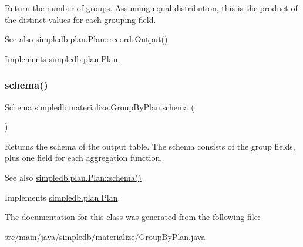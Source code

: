 Return the number of groups. Assuming equal distribution, this is the product of the distinct values for each grouping field. \begin{DoxySeeAlso}{See also}
\hyperlink{interfacesimpledb_1_1plan_1_1Plan_a187e06657d356c80a7f743d7ff8fd257}{simpledb.\+plan.\+Plan\+::records\+Output()} 
\end{DoxySeeAlso}


Implements \hyperlink{interfacesimpledb_1_1plan_1_1Plan_a187e06657d356c80a7f743d7ff8fd257}{simpledb.\+plan.\+Plan}.

\mbox{\label{classsimpledb_1_1materialize_1_1GroupByPlan_a2060788080c03855f35d72a1742e6ec6}} 
\subsubsection{\texorpdfstring{schema()}{schema()}}
{\footnotesize\ttfamily \hyperlink{classsimpledb_1_1record_1_1Schema}{Schema} simpledb.\+materialize.\+Group\+By\+Plan.\+schema (\begin{DoxyParamCaption}{ }\end{DoxyParamCaption})\hspace{0.3cm}{\ttfamily [inline]}}

Returns the schema of the output table. The schema consists of the group fields, plus one field for each aggregation function. \begin{DoxySeeAlso}{See also}
\hyperlink{interfacesimpledb_1_1plan_1_1Plan_ad0ee1aa2c4e7147e9f8fc6f3301fa986}{simpledb.\+plan.\+Plan\+::schema()} 
\end{DoxySeeAlso}


Implements \hyperlink{interfacesimpledb_1_1plan_1_1Plan_ad0ee1aa2c4e7147e9f8fc6f3301fa986}{simpledb.\+plan.\+Plan}.



The documentation for this class was generated from the following file\+:\begin{DoxyCompactItemize}
\item 
src/main/java/simpledb/materialize/Group\+By\+Plan.\+java\end{DoxyCompactItemize}
